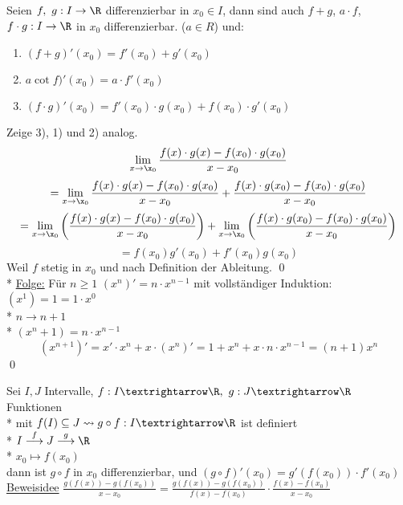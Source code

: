 Seien $f,\ g: I \to \R$ differenzierbar in $x_0 \in I$, dann sind auch $f + g$, $a \cdot f$, $f \cdot g: I \to \R$ in $x_0$ differenzierbar. ($a \in R$) und:
\begin{enumerate}
\item{$(f + g)'(x_0) = f'(x_0) + g'(x_0)$}
\item{$a \cot f)'(x_0) = a \cdot f'(x_0)$}
\item{$(f \cdot g)'(x_0) = f'(x_0) \cdot g(x_0) + f(x_0) \cdot g'(x_0)$}
\end{enumerate}
\bew
Zeige 3), 1) und 2) analog.\\
$$\lim_{x \to \x_0} \frac{f(x) \cdot g(x) - f(x_0) \cdot g(x_0)}{x - x_0}$$
$$= \lim_{x \to \x_0} \frac{f(x) \cdot g(x) - f(x_0) \cdot g(x_0)}{x - x_0} + \frac{f(x) \cdot g(x_0) - f(x_0) \cdot g(x_0)}{x - x_0}$$
$$= \lim_{x \to \x_0} \left( \frac{f(x) \cdot g(x) - f(x_0) \cdot g(x_0)}{x - x_0} \right) + \lim_{x \to \x_0}\left( \frac{f(x) \cdot g(x_0) - f(x_0) \cdot g(x_0)}{x - x_0} \right)$$
$$=f(x_0)g'(x_0) + f'(x_0)g(x_0)$$
Weil $f$ stetig in $x_0$ und nach Definition der Ableitung. \qed{}\\*
\ul{Folge:} Für $n \geq 1$ $(x^n)' = n \cdot x^{n-1}$
\bew
mit vollständiger Induktion:
$(x^1) = 1 =1 \cdot x^0$ \ok\\*
$n \to n + 1$\\*
$(x^n+1) = n\cdot x^{n-1}$
$$(x^{n+1})' = x' \cdot x^n + x \cdot (x^n)' = 1 + x^n + x \cdot n \cdot x^{n-1} = (n+1) x^n$$ \qed

Sei $I,J$ Intervalle, $f:I→\R,\ g:J→\R$ Funktionen\\*
mit $f(I)\subseteq J \leadsto g\circ f:I→\R$ ist definiert\\*
$I\stackrel{f}{\longrightarrow}J\stackrel{g}{\longrightarrow}\R$\\*
$x_0\longmapsto f(x_0)$\\
dann ist $g\circ f$ in $x_0$ differenzierbar,
und $(g\circ f)'(x_0)=g'(f(x_0))·f'(x_0)$
\ul{Beweisidee} $\frac{g(f(x)) - g(f(x_0))}{x-x_0} = \frac{g(f(x)) - g(f(x_0))}{f(x)-f(x_0)} \cdot \frac{f(x) - f(x_0)}{x-x_0}$